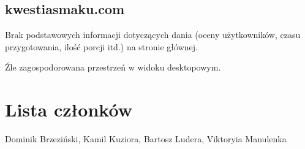 \documentclass{article}
\newenvironment{itemize.zip}
{ \begin{itemize}
    \setlength{\itemsep}{0pt}
    \setlength{\parskip}{0pt}
    \setlength{\parsep}{0pt}     }
{ \end{itemize}                  }
\begin{document}
\subsection{kwestiasmaku.com}
\begin{itemize.zip}
    \item Brak podstawowych informacji dotyczących dania (oceny użytkowników, czasu przygotowania, ilość porcji itd.) na stronie głównej.
    \item Źle zagospodorowana przestrzeń w widoku desktopowym.
\end{itemize.zip}
\section{Lista członków}
    Dominik Brzeziński, Kamil Kuziora, Bartosz Ludera, Viktoryia Manulenka
\end{document}
